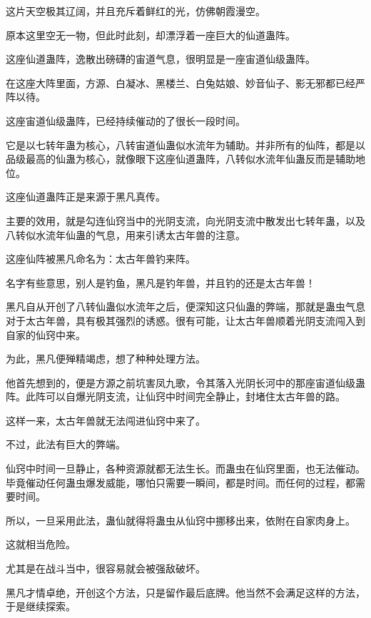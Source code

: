 
\begin{this_body}



这片天空极其辽阔，并且充斥着鲜红的光，仿佛朝霞漫空。

原本这里空无一物，但此时此刻，却漂浮着一座巨大的仙道蛊阵。

这座仙道蛊阵，逸散出磅礴的宙道气息，很明显是一座宙道仙级蛊阵。

在这座大阵里面，方源、白凝冰、黑楼兰、白兔姑娘、妙音仙子、影无邪都已经严阵以待。

这座宙道仙级蛊阵，已经持续催动的了很长一段时间。

它是以七转年蛊为核心，八转宙道仙蛊似水流年为辅助。并非所有的仙阵，都是以品级最高的仙蛊为核心，就像眼下这座仙道蛊阵，八转似水流年仙蛊反而是辅助地位。

这座仙道蛊阵正是来源于黑凡真传。

主要的效用，就是勾连仙窍当中的光阴支流，向光阴支流中散发出七转年蛊，以及八转似水流年仙蛊的气息，用来引诱太古年兽的注意。

这座仙阵被黑凡命名为：太古年兽钓来阵。

名字有些意思，别人是钓鱼，黑凡是钓年兽，并且钓的还是太古年兽！

黑凡自从开创了八转仙蛊似水流年之后，便深知这只仙蛊的弊端，那就是蛊虫气息对于太古年兽，具有极其强烈的诱惑。很有可能，让太古年兽顺着光阴支流闯入到自家的仙窍中来。

为此，黑凡便殚精竭虑，想了种种处理方法。

他首先想到的，便是方源之前坑害凤九歌，令其落入光阴长河中的那座宙道仙级蛊阵。此阵可以自爆光阴支流，让仙窍中时间完全静止，封堵住太古年兽的路。

这样一来，太古年兽就无法闯进仙窍中来了。

不过，此法有巨大的弊端。

仙窍中时间一旦静止，各种资源就都无法生长。而蛊虫在仙窍里面，也无法催动。毕竟催动任何蛊虫爆发威能，哪怕只需要一瞬间，都是时间。而任何的过程，都需要时间。

所以，一旦采用此法，蛊仙就得将蛊虫从仙窍中挪移出来，依附在自家肉身上。

这就相当危险。

尤其是在战斗当中，很容易就会被强敌破坏。

黑凡才情卓绝，开创这个方法，只是留作最后底牌。他当然不会满足这样的方法，于是继续探索。


\end{this_body}
